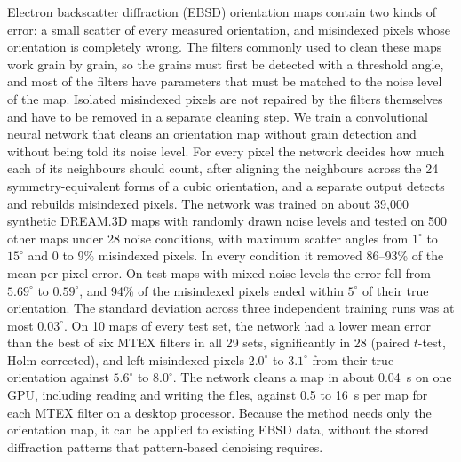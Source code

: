 Electron backscatter diffraction (EBSD) orientation maps contain two kinds of
error: a small scatter of every measured orientation, and misindexed pixels
whose orientation is completely wrong. The filters commonly used to clean these
maps work grain by grain, so the grains must first be detected with a
threshold angle, and most of the filters have parameters that must be matched
to the noise level of the map. Isolated misindexed pixels are not repaired by
the filters themselves and have to be removed in a separate cleaning step. We
train a convolutional neural network that cleans an orientation map without
grain detection and without being told its noise level. For every pixel the
network decides how much each of its neighbours should count, after aligning
the neighbours across the 24 symmetry-equivalent forms of a cubic orientation,
and a separate output detects and rebuilds misindexed pixels. The network was
trained on about 39{,}000 synthetic DREAM.3D maps with randomly drawn noise
levels and tested on 500 other maps under 28 noise conditions, with maximum
scatter angles from $1^\circ$ to $15^\circ$ and 0 to 9\% misindexed pixels. In
every condition it removed 86--93\% of the mean per-pixel error. On test maps
with mixed noise levels the error fell from $5.69^\circ$ to $0.59^\circ$, and
94\% of the misindexed pixels ended within $5^\circ$ of their true orientation.
The standard deviation across three independent training runs was at most
$0.03^\circ$. On 10 maps of every test set, the network had a lower mean
error than the best of six MTEX filters in all 29 sets, significantly in 28
(paired $t$-test, Holm-corrected), and left misindexed pixels $2.0^\circ$ to
$3.1^\circ$ from their true orientation against $5.6^\circ$ to $8.0^\circ$.
The network cleans a map in about 0.04~s on one GPU, including reading and
writing the files, against 0.5 to 16~s per map for each MTEX filter on a
desktop processor. Because the method needs only the
orientation map, it can be applied to existing EBSD data, without the stored
diffraction patterns that pattern-based denoising requires.

